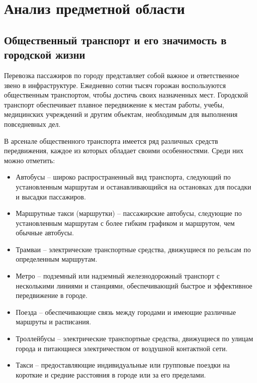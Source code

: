 \section{Анализ предметной области}
\subsection{Общественный транспорт и его значимость в городской жизни}

Перевозка пассажиров по городу представляет собой важное и ответственное звено в инфраструктуре. Ежедневно сотни тысяч горожан воспользуются общественным транспортом, чтобы достичь своих назначенных мест. Городской транспорт обеспечивает плавное передвижение к местам работы, учебы, медицинских учреждений и другим объектам, необходимым для выполнения повседневных дел.

В арсенале общественного транспорта имеется ряд различных средств передвижения, каждое из которых обладает своими особенностями. Среди них можно отметить:
\begin{itemize}
	\item Автобусы – широко распространенный вид транспорта, следующий по установленным маршрутам и останавливающийся на остановках для посадки и высадки пассажиров.
	\item Маршрутные такси (маршрутки) – пассажирские автобусы, следующие по установленным маршрутам с более гибким графиком и маршрутом, чем обычные автобусы.
	\item Трамваи – электрические транспортные средства, движущиеся по рельсам по определенным маршрутам.
	\item Метро – подземный или надземный железнодорожный транспорт с несколькими линиями и станциями, обеспечивающий быстрое и эффективное передвижение в городе.
	\item Поезда – обеспечивающие связь между городами и имеющие различные маршруты и расписания.
	\item Троллейбусы – электрические транспортные средства, движущиеся по улицам города и питающиеся электричеством от воздушной контактной сети.
	\item Такси – предоставляющие индивидуальные или групповые поездки на короткие и средние расстояния в городе или за его пределами.
\end{itemize}

